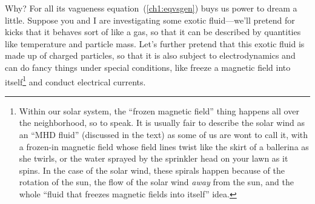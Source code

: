 Why? For all its vagueness equation~(\ref{ch1:eqvsgen}) buys us power to dream a
little. Suppose you and I are investigating some exotic fluid---we'll pretend
for kicks that it behaves sort of like a gas, so that it can be described by
quantities like temperature and particle mass. Let's further pretend that this
exotic fluid is made up of charged particles, so that it is also subject to
electrodynamics and can do fancy things under special conditions, like freeze a
magnetic field into itself\footnote{Within our solar system, the ``frozen
  magnetic field'' thing happens all over the neighborhood, so to speak. It is
  usually fair to describe the solar wind as an ``MHD fluid'' (discussed in the
  text) as some of us are wont to call it, with a frozen-in magnetic field whose
  field lines twist like the skirt of a ballerina as she twirls, or the water
  sprayed by the sprinkler head on your lawn as it spins. In the case of the
  solar wind, these spirals happen because of the rotation of the sun, the flow
  of the solar wind \emph{away} from the sun, and the whole ``fluid that freezes
  magnetic fields into itself'' idea.}  and conduct electrical currents.

